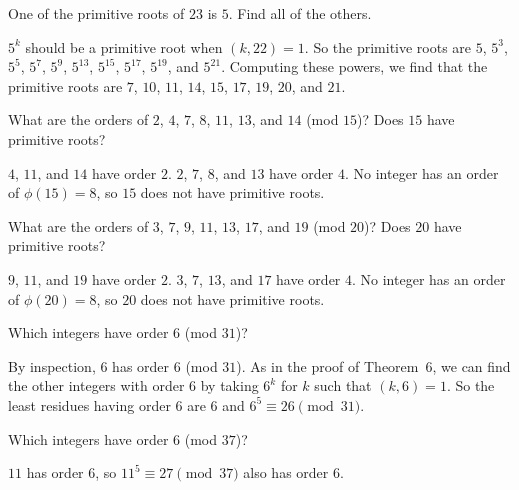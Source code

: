  One of the primitive roots of $23$ is $5$. Find all of the
others.
\begin{solution}
  $5^k$ should be a primitive root when $(k,22) = 1$. So the primitive
  roots are $5$, $5^3$, $5^5$, $5^7$, $5^9$, $5^{13}$, $5^{15}$,
  $5^{17}$, $5^{19}$, and $5^{21}$. Computing these powers, we find
  that the primitive roots are $7$, $10$, $11$, $14$, $15$, $17$,
  $19$, $20$, and $21$.
\end{solution}

 What are the orders of $2$, $4$, $7$, $8$, $11$, $13$, and
$14$ (mod $15$)? Does $15$ have primitive roots?
\begin{solution}
  $4$, $11$, and $14$ have order $2$. $2$, $7$, $8$, and $13$ have
  order $4$. No integer has an order of $\phi(15) = 8$, so $15$ does
  not have primitive roots.
\end{solution}

 What are the orders of $3$, $7$, $9$, $11$, $13$, $17$, and
$19$ (mod $20$)? Does $20$ have primitive roots?
\begin{solution}
  $9$, $11$, and $19$ have order $2$. $3$, $7$, $13$, and $17$ have
  order $4$. No integer has an order of $\phi(20) = 8$, so $20$ does
  not have primitive roots.
\end{solution}

 Which integers have order $6$ (mod $31$)?
\begin{solution}
  By inspection, $6$ has order $6$ (mod $31$). As in the proof of
  Theorem~6, we can find the other integers with order $6$ by taking
  $6^k$ for $k$ such that $(k,6) = 1$. So the least residues having
  order $6$ are $6$ and $6^5\equiv26\pmod{31}$.
\end{solution}

 Which integers have order $6$ (mod $37$)?
\begin{solution}
  $11$ has order $6$, so $11^5\equiv27\pmod{37}$ also has order $6$.
\end{solution}
